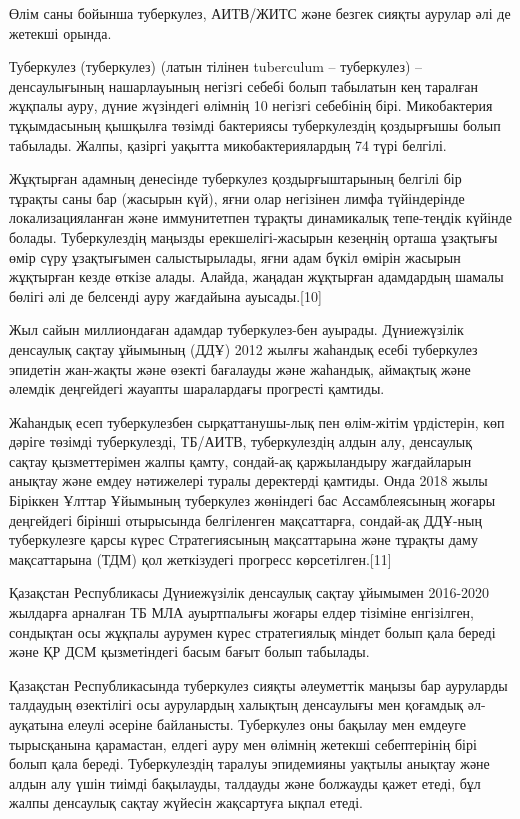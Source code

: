 \begin{multicols}{2}
Өлім саны бойынша туберкулез, АИТВ/ЖИТС және безгек сияқты аурулар әлі
де жетекші орында.

Туберкулез (туберкулез) (латын тілінен tuberculum -- туберкулез) --
денсаулығының нашарлауының негізгі себебі болып табылатын кең таралған
жұқпалы ауру, дүние жүзіндегі өлімнің 10 негізгі себебінің бірі.
Микобактерия тұқымдасының қышқылға төзімді бактериясы туберкулездің
қоздырғышы болып табылады. Жалпы, қазіргі уақытта микобактериялардың 74
түрі белгілі.

Жұқтырған адамның денесінде туберкулез қоздырғыштарының белгілі бір
тұрақты саны бар (жасырын күй), яғни олар негізінен лимфа түйіндерінде
локализацияланған және иммунитетпен тұрақты динамикалық тепе-теңдік
күйінде болады. Туберкулездің маңызды ерекшелігі-жасырын кезеңнің орташа
ұзақтығы өмір сүру ұзақтығымен салыстырылады, яғни адам бүкіл өмірін
жасырын жұқтырған кезде өткізе алады. Алайда, жаңадан жұқтырған
адамдардың шамалы бөлігі әлі де белсенді ауру жағдайына ауысады.{[}10{]}

Жыл сайын миллиондаған адамдар туберкулез-бен ауырады. Дүниежүзілік
денсаулық сақтау ұйымының (ДДҰ) 2012 жылғы жаһандық есебі туберкулез
эпидетін жан-жақты және өзекті бағалауды және жаһандық, аймақтық және
әлемдік деңгейдегі жауапты шаралардағы прогресті қамтиды.

Жаһандық есеп туберкулезбен сырқаттанушы-лық пен өлім-жітім үрдістерін,
көп дәріге төзімді туберкулезді, ТБ/АИТВ, туберкулездің алдын алу,
денсаулық сақтау қызметтерімен жалпы қамту, сондай-ақ қаржыландыру
жағдайларын анықтау және емдеу нәтижелері туралы деректерді қамтиды.
Онда 2018 жылы Біріккен Ұлттар Ұйымының туберкулез жөніндегі бас
Ассамблеясының жоғары деңгейдегі бірінші отырысында белгіленген
мақсаттарға, сондай-ақ ДДҰ-ның туберкулезге қарсы күрес Стратегиясының
мақсаттарына және тұрақты даму мақсаттарына (ТДМ) қол жеткізудегі
прогресс көрсетілген.{[}11{]}

Қазақстан Республикасы Дүниежүзілік денсаулық сақтау ұйымымен 2016-2020
жылдарға арналған ТБ МЛА ауыртпалығы жоғары елдер тізіміне енгізілген,
сондықтан осы жұқпалы аурумен күрес стратегиялық міндет болып қала
береді және ҚР ДСМ қызметіндегі басым бағыт болып табылады.

Қазақстан Республикасында туберкулез сияқты әлеуметтік маңызы бар
ауруларды талдаудың өзектілігі осы аурулардың халықтың денсаулығы мен
қоғамдық әл-ауқатына елеулі әсеріне байланысты. Туберкулез оны бақылау
мен емдеуге тырысқанына қарамастан, елдегі ауру мен өлімнің жетекші
себептерінің бірі болып қала береді. Туберкулездің таралуы эпидемияны
уақтылы анықтау және алдын алу үшін тиімді бақылауды, талдауды және
болжауды қажет етеді, бұл жалпы денсаулық сақтау жүйесін жақсартуға
ықпал етеді.


\end{multicols}
